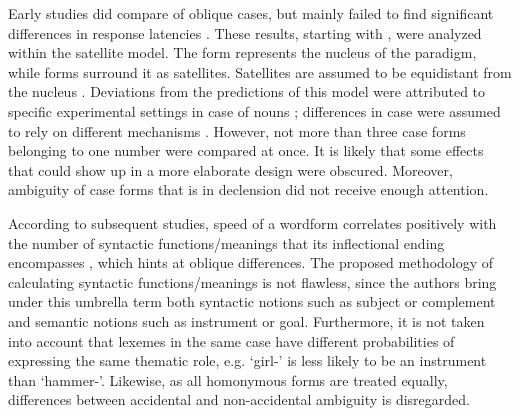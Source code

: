 \documentclass[output=paper, modfonts,newtxmath,hidelinks]{langscibook}
\begin{document}
Early  studies did compare  of oblique cases, but mainly failed to find significant differences in response latencies \citep{lukatela1978lexical, lukatelaEtAl1980, lukatela1987lexical, katz1987grammatical, kostic1987processing, feldman1987inflected}. These results, starting with \citet{lukatelaEtAl1980}, were analyzed within the satellite model. The  form represents the nucleus of the  paradigm, while  forms surround it as satellites. Satellites are assumed to be equidistant from the nucleus \citep{feldman1987inflected}. Deviations from the predictions of this model were attributed to specific experimental settings in case of nouns \citep{feldman1987inflected, todorovic1988hemispheric}; differences in  case  were assumed to rely on different mechanisms \citep{kostic1987processing}. However, not more than three case forms belonging to one number were compared at once. It is likely that some effects that could show up in a more elaborate design were obscured. Moreover, ambiguity of case forms that is  in  declension did not receive enough attention. 

According to subsequent  studies,  speed of a wordform correlates positively with the number of syntactic functions\slash meanings that its inflectional ending encompasses \citep{kostic1991informational, kostic1995information, kostic2003inflectional, filipovic2003processing,vseva2003annotated}, which hints at oblique  differences. The proposed methodology of calculating syntactic functions\slash meanings is not flawless, since the authors bring under this umbrella term both syntactic notions such as subject or complement and semantic notions such as instrument or goal. Furthermore, it is not taken into account that lexemes in the same case have different probabilities of expressing the same thematic role, e.g. `girl-\ins' is less likely to be an instrument than `hammer-\ins'. Likewise, as all homonymous forms are treated equally, differences between accidental and non-accidental ambiguity is disregarded.
\end{document}
